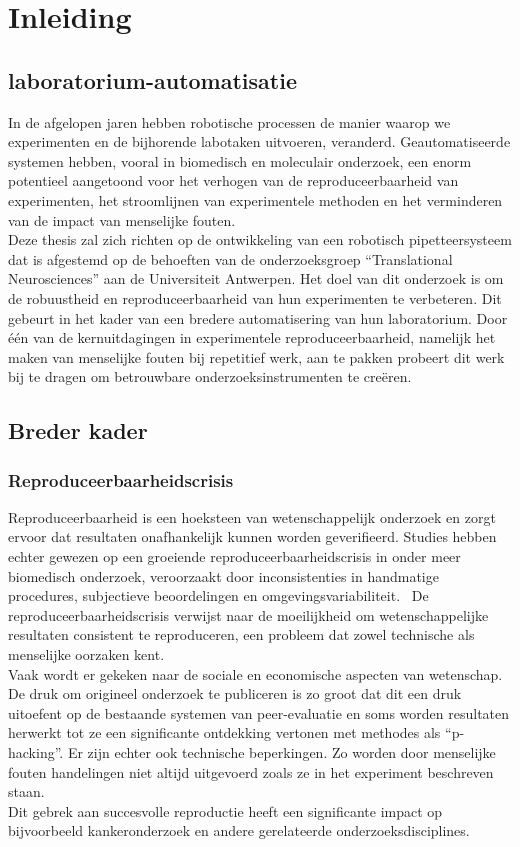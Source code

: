 \chapter{Inleiding}
\section{laboratorium-automatisatie}
In de afgelopen jaren hebben robotische processen de manier waarop we experimenten en de bijhorende labotaken uitvoeren, veranderd. Geautomatiseerde systemen hebben, vooral in biomedisch en moleculair onderzoek, een enorm potentieel aangetoond voor het verhogen van de reproduceerbaarheid van experimenten, het stroomlijnen van experimentele methoden en het verminderen van de impact van menselijke fouten.\cite{RN5} 
\\[12pt]Deze thesis zal zich richten op de ontwikkeling van een robotisch pipetteersysteem dat is afgestemd op de behoeften van de onderzoeksgroep ``Translational Neurosciences'' aan de Universiteit Antwerpen. Het doel van dit onderzoek is om de robuustheid en reproduceerbaarheid van hun experimenten te verbeteren. Dit gebeurt in het kader van een bredere automatisering van hun laboratorium. Door één van de kernuitdagingen in experimentele reproduceerbaarheid, namelijk het maken van menselijke fouten bij repetitief werk, aan te pakken probeert dit werk bij te dragen om betrouwbare onderzoeksinstrumenten te creëren.

\section{Breder kader}

\subsection{Reproduceerbaarheidscrisis}
Reproduceerbaarheid is een hoeksteen van wetenschappelijk onderzoek en zorgt ervoor dat resultaten onafhankelijk kunnen worden geverifieerd. Studies hebben echter gewezen op een groeiende reproduceerbaarheidscrisis in onder meer biomedisch onderzoek, veroorzaakt door inconsistenties in handmatige procedures, subjectieve beoordelingen en omgevingsvariabiliteit.\ \cite{RN2} De reproduceerbaarheidscrisis verwijst naar de moeilijkheid om wetenschappelijke resultaten consistent te reproduceren, een probleem dat zowel technische als menselijke oorzaken kent. 
\\[12pt]Vaak wordt er gekeken naar de sociale en economische aspecten van wetenschap.\cite{RN12} De druk om origineel onderzoek te publiceren is zo groot dat dit een druk uitoefent op de bestaande systemen van peer-evaluatie en soms worden resultaten herwerkt tot ze een significante ontdekking vertonen met methodes als “p-hacking”.\cite{RN2,RN6} Er zijn echter ook technische beperkingen. Zo worden door menselijke fouten handelingen niet altijd uitgevoerd zoals ze in het experiment beschreven staan. 
\\[12pt]Dit gebrek aan succesvolle reproductie heeft een significante impact op bijvoorbeeld kankeronderzoek en andere gerelateerde onderzoeksdisciplines.\ \cite{RN4}

